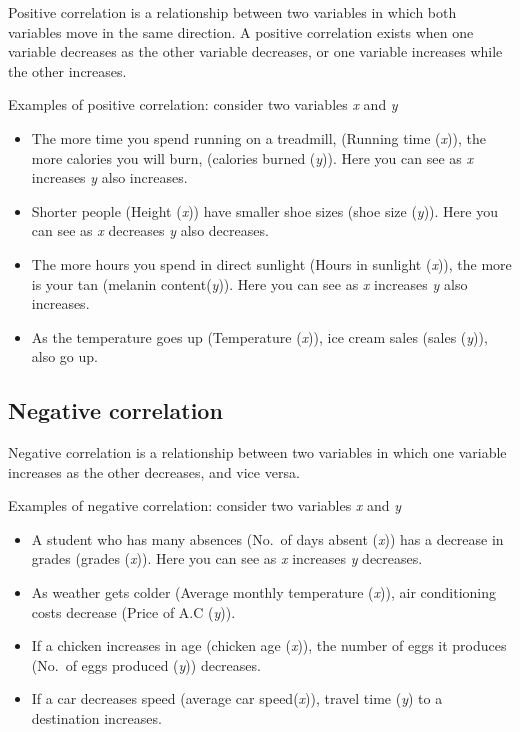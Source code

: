 \documentclass[
]{book}
\begin{document}
Positive correlation is a relationship between two variables in which
both variables move in the same direction. A positive correlation exists
when one variable decreases as the other variable decreases, or one
variable increases while the other increases.

Examples of positive correlation: consider two variables \emph{x} and \emph{y}

\begin{itemize}
\item
  The more time you spend running on a treadmill, (Running time
  (\emph{x})), the more calories you will burn, (calories burned (\emph{y})).
  Here you can see as \emph{x} increases \emph{y} also increases.
\item
  Shorter people (Height (\emph{x})) have smaller shoe sizes (shoe size
  (\emph{y})). Here you can see as \emph{x} decreases \emph{y} also decreases.
\item
  The more hours you spend in direct sunlight (Hours in sunlight
  (\emph{x})), the more is your tan (melanin content(\emph{y})). Here you can
  see as \emph{x} increases \emph{y} also increases.
\item
  As the temperature goes up (Temperature (\emph{x})), ice cream sales
  (sales (\emph{y})), also go up.
\end{itemize}

\hypertarget{negative-correlation}{%
\subsection{Negative correlation}\label{negative-correlation}}

Negative correlation is a relationship between two variables in which
one variable increases as the other decreases, and vice versa.

Examples of negative correlation: consider two variables \emph{x} and \emph{y}

\begin{itemize}
\item
  A student who has many absences (No.~of days absent (\emph{x})) has a
  decrease in grades (grades (\emph{x})). Here you can see as \emph{x} increases
  \emph{y} decreases.
\item
  As weather gets colder (Average monthly temperature (\emph{x})), air
  conditioning costs decrease (Price of A.C (\emph{y})).
\item
  If a chicken increases in age (chicken age (\emph{x})), the number of
  eggs it produces (No.~of eggs produced (\emph{y})) decreases.
\item
  If a car decreases speed (average car speed(\emph{x})), travel time (\emph{y})
  to a destination increases.
\end{itemize}
\end{document}
